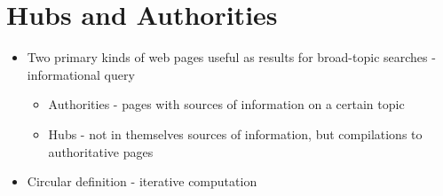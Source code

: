 \documentclass[11pt]{report}
\begin{document}
\section{Hubs and Authorities}
\begin{itemize}
\item Two primary kinds of web pages useful as results for broad-topic searches - informational query
\begin{itemize}
\item Authorities - pages with sources of information on a certain topic
\item Hubs - not in themselves sources of information, but compilations to authoritative pages
\end{itemize}
\item Circular definition - iterative computation
\end{itemize}
\end{document}
